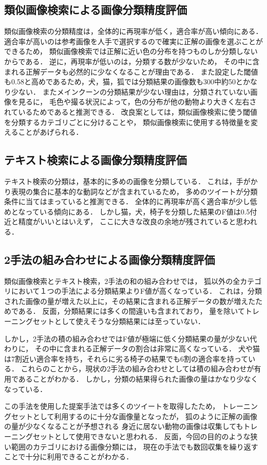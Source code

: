 \subsection{類似画像検索による画像分類精度評価}
類似画像検索の分類精度は，全体的に再現率が低く，適合率が高い傾向にある．
適合率が高いのは参考画像を人手で選択するので確実に正解の画像を選ぶことができるため，
類似画像検索では正解に近い色の分布を持つものしか分類しないからである．
逆に，再現率が低いのは，分類する数が少ないため，
その中に含まれる正解データも必然的に少なくなることが理由である．
また設定した閾値も0.58と高めであるため，犬，猫，狐では分類結果の画像数も300中約50とかなり少ない．
またメインクーンの分類結果が少ない理由は，分類されていない画像を見るに，
毛色や撮る状況によって，色の分布が他の動物より大きく左右されているためであると推測できる．
改良案としては，類似画像検索に使う閾値を分類するカテゴリごとに分けることや，
類似画像検索に使用する特徴量を変えることがあげられる．

\subsection{テキスト検索による画像分類精度評価}
テキスト検索の分類は，基本的に多めの画像を分類している．
これは，手がかり表現の集合に基本的な動詞などが含まれているため，
多めのツイートが分類条件に当てはまっていると推測できる．
全体的に再現率が高く適合率が少し低めとなっている傾向にある．
しかし猫，犬，椅子を分類した結果のF値は0.5付近と精度がいいとはいえず，
ここに大きな改良の余地が残されていると思われる．

\subsection{2手法の組み合わせによる画像分類精度評価}
類似画像検索とテキスト検索，2手法の和の組み合わせでは，
狐以外の全カテゴリにおいて１つの手法による分類結果よりF値が高くなっている．
これは，分類された画像の量が増えた以上に，その結果に含まれる正解データの数が増えたためである．
反面，分類結果には多くの間違いも含まれており，
量を除いてトレーニングセットとして使えそうな分類結果には至っていない．

しかし，2手法の積の組み合わせではF値が極端に低く分類結果の量が少ない代わりに，
その中に含まれる正解データの割合は非常に高くなっている．
犬や猫は7割近い適合率を持ち，それらに劣る椅子の結果でも6割の適合率を持っている．
これらのことから，現状の2手法の組み合わせとしては積の組み合わせが有用であることがわかる．
しかし，分類の結果得られた画像の量はかなり少なくなっている．

この手法を使用した提案手法では多くのツイートを取得したため，
トレーニングセットとして利用するのに十分な画像量となったが，
狐のように正解の画像の量が少なくなることが予想される
身近に居ない動物の画像は収集してもトレーニングセットとして使用できないと思われる．
反面，今回の目的のような狭い範囲のカテゴリにおける画像分類には，
現在の手法でも数回収集を繰り返すことで十分に利用できることがわかる．
